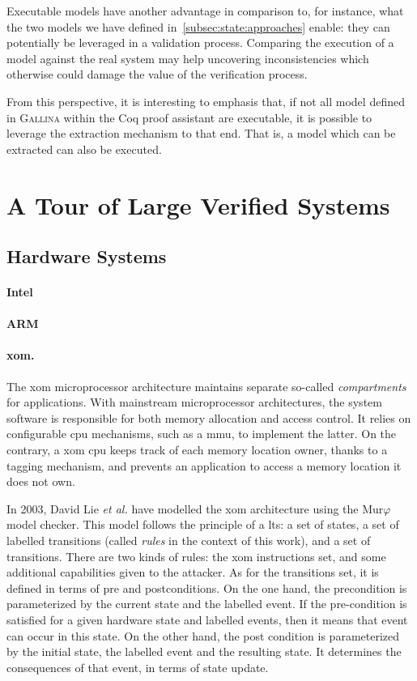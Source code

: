 Executable models have another advantage in comparison to, for instance, what
the two models we have defined in~\ref{subsec:state:approaches} enable: they can
potentially be leveraged in a validation process.
%
Comparing the execution of a model against the real system may help uncovering
inconsistencies which otherwise could damage the value of the verification
process.

From this perspective, it is interesting to emphasis that, if not all model
defined in {\scshape Gallina} within the Coq proof assistant are executable, it
is possible to leverage the extraction mechanism to that end.
%
That is, a model which can be extracted can also be executed.

\section{A Tour of Large Verified Systems}

\subsection{Hardware Systems}

\paragraph{Intel}
%

\paragraph{ARM}
%

\paragraph{\ac{xom}.}
%
The \ac{xom} microprocessor architecture maintains separate so-called
\emph{compartments} for applications.
%
With mainstream microprocessor architectures, the system software is responsible
for both memory allocation and access control.
%
It relies on configurable \ac{cpu} mechanisms, such as a \ac{mmu}, to implement
the latter.
%
On the contrary, a \ac{xom} \ac{cpu} keeps track of each memory location owner,
thanks to a tagging mechanism, and prevents an application to access a memory
location it does not own.

In 2003, David Lie \emph{et al.} have modelled the \ac{xom} architecture using
the Mur$\varphi$ model checker.
%
This model follows the principle of a \ac{lts}: a set of states, a set of
labelled transitions (called \emph{rules} in the context of this work), and a
set of transitions.
%
There are two kinds of rules: the \ac{xom} instructions set, and some additional
capabilities given to the attacker.
%
As for the transitions set, it is defined in terms of pre and postconditions.
%
On the one hand, the precondition is parameterized by the current state and the
labelled event.
%
If the pre-condition is satisfied for a given hardware state and labelled
events, then it means that event can occur in this state.
%
On the other hand, the post condition is parameterized by the initial state, the
labelled event and the resulting state.
%
It determines the consequences of that event, in terms of state update.

